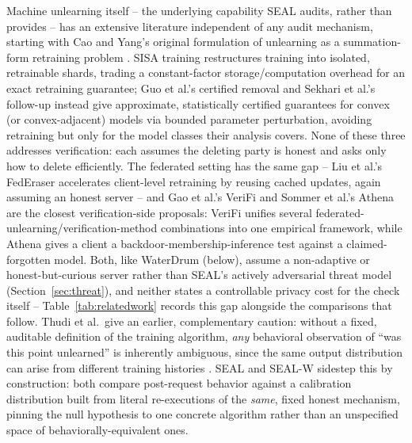 \documentclass[10pt,journal,compsoc]{IEEEtran}
\begin{document}
Machine unlearning itself -- the underlying capability SEAL audits, rather than provides -- has an extensive literature independent of any audit mechanism, starting with Cao and Yang's original formulation of unlearning as a summation-form retraining problem \cite{cao2015towards}. SISA training \cite{bourtoule2021sisa} restructures training into isolated, retrainable shards, trading a constant-factor storage/computation overhead for an exact retraining guarantee; Guo et al.'s certified removal \cite{guo2020certified} and Sekhari et al.'s follow-up \cite{sekhari2021remember} instead give approximate, statistically certified guarantees for convex (or convex-adjacent) models via bounded parameter perturbation, avoiding retraining but only for the model classes their analysis covers. None of these three addresses verification: each assumes the deleting party is honest and asks only how to delete efficiently. The federated setting has the same gap -- Liu et al.'s FedEraser \cite{liu2021federaser} accelerates client-level retraining by reusing cached updates, again assuming an honest server -- and Gao et al.'s VeriFi \cite{gao2024verifi} and Sommer et al.'s Athena \cite{sommer2022athena} are the closest verification-side proposals: VeriFi unifies several federated-unlearning/verification-method combinations into one empirical framework, while Athena gives a client a backdoor-membership-inference test against a claimed-forgotten model. Both, like WaterDrum (below), assume a non-adaptive or honest-but-curious server rather than SEAL's actively adversarial threat model (Section~\ref{sec:threat}), and neither states a controllable privacy cost for the check itself -- Table~\ref{tab:relatedwork} records this gap alongside the comparisons that follow. Thudi et al.\ give an earlier, complementary caution: without a fixed, auditable definition of the training algorithm, \emph{any} behavioral observation of ``was this point unlearned'' is inherently ambiguous, since the same output distribution can arise from different training histories \cite{thudi2022necessity}. SEAL and SEAL-W sidestep this by construction: both compare post-request behavior against a calibration distribution built from literal re-executions of the \emph{same}, fixed honest mechanism, pinning the null hypothesis to one concrete algorithm rather than an unspecified space of behaviorally-equivalent ones.
\end{document}
